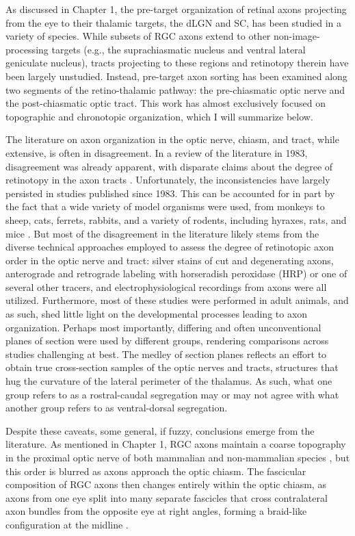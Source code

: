 \label{sec:RetinogeniculateOrganization}
As discussed in Chapter 1, the pre-target organization of retinal axons projecting from the eye to their thalamic targets, the dLGN and SC, has been studied in a variety of species.
While subsets of RGC axons extend to other non-image-processing targets (e.g., the suprachiasmatic nucleus and ventral lateral geniculate nucleus), tracts projecting to these regions and retinotopy therein have been largely unstudied.
Instead, pre-target axon sorting has been examined along two segments of the retino-thalamic pathway: the pre-chiasmatic optic nerve and the post-chiasmatic optic tract.
This work has almost exclusively focused on topographic and chronotopic organization, which I will summarize below.

The literature on axon organization in the optic nerve, chiasm, and tract, while extensive, is often in disagreement.
In a review of the literature in 1983, disagreement was already apparent, with disparate claims about the degree of retinotopy in the axon tracts \cite{martin1983role}.
Unfortunately, the inconsistencies have largely persisted in studies published since 1983.
This can be accounted for in part by the fact that a wide variety of model organisms were used, from monkeys to sheep, cats, ferrets, rabbits, and a variety of rodents, including hyraxes, rats, and mice \cite{martin1983role}. 
But most of the disagreement in the literature likely stems from the diverse technical approaches employed to assess the degree of retinotopic axon order in the optic nerve and tract: silver stains of cut and degenerating axons, anterograde and retrograde labeling with horseradish peroxidase (HRP) or one of several other tracers, and electrophysiological recordings from axons were all utilized.
Furthermore, most of these studies were performed in adult animals, and as such, shed little light on the developmental processes leading to axon organization.
Perhaps most importantly, differing and often unconventional planes of section were used by different groups, rendering comparisons across studies challenging at best.
The medley of section planes reflects an effort to obtain true cross-section samples of the optic nerves and tracts, structures that hug the curvature of the lateral perimeter of the thalamus.
As such, what one group refers to as a rostral-caudal segregation may or may not agree with what another group refers to as ventral-dorsal segregation. %

Despite these caveats, some general, if fuzzy, conclusions emerge from the literature.
As mentioned in Chapter 1, RGC axons maintain a coarse topography in the proximal optic nerve of both mammalian \cite{horton1979non,naito1986course,simon1991relationship,reese1993reestablishment,chan1994changes,naito1994retinogeniculate,chan1999changes,plas2005pretarget} and non-mammalian species \cite{ehrlich1984course,montgomery1998organization}, but this order is blurred as axons approach the optic chiasm.
The fascicular composition of RGC axons then changes entirely within the optic chiasm, as axons from one eye split into many separate fascicles that cross contralateral axon bundles from the opposite eye at right angles, forming a braid-like configuration at the midline \cite{colello1998changing}.

